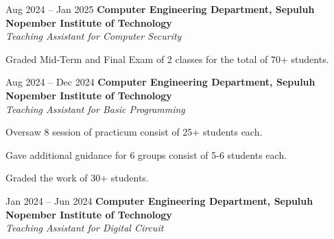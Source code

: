     \vspace{0.2 cm}

    \begin{twocolentry}{
        Aug 2024 – Jan 2025
    }
    \textbf{Computer Engineering Department, Sepuluh Nopember Institute of Technology}\\
    \textit{Teaching Assistant for Computer Security}
    \end{twocolentry}

    \vspace{0.10 cm}
    \begin{onecolentry}
        \begin{highlights}
            \item Graded Mid-Term and Final Exam of 2 classes for the total of 70+ students.
            \end{highlights}
    \end{onecolentry}

    \vspace{0.2 cm}

    \begin{twocolentry}{
        Aug 2024 – Dec 2024
    }
    \textbf{Computer Engineering Department, Sepuluh Nopember Institute of Technology}\\
    \textit{Teaching Assistant for Basic Programming}
    \end{twocolentry}

    \vspace{0.10 cm}
    \begin{onecolentry}
        \begin{highlights}
            \item Oversaw 8 session of practicum consist of 25+ students each.
            \item Gave additional guidance for 6 groups consist of 5-6 students each.
            \item Graded the work of 30+ students.
        \end{highlights}
    \end{onecolentry}

    \vspace{0.2 cm}

    \begin{twocolentry}{
        Jan 2024 – Jun 2024
    }
    \textbf{Computer Engineering Department, Sepuluh Nopember Institute of Technology}\\
    \textit{Teaching Assistant for Digital Circuit}
    \end{twocolentry}

